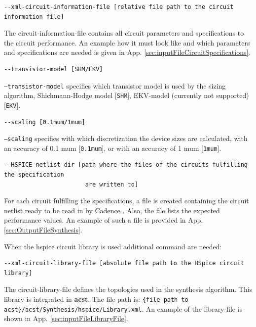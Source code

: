 \begin{lstlisting}[basicstyle=\ttfamily\scriptsize,backgroundcolor={\color{gray!30}}, escapechar=? ]
--xml-circuit-information-file [relative file path to the circuit information file] 
\end{lstlisting}
The circuit-information-file contains all circuit parameters and specifications to the circuit performance. An example how it must look like and which parameters and specifications are needed is given in App. \ref{sec:inputFileCircuitSpecifications}.

\begin{lstlisting}[basicstyle=\ttfamily\scriptsize,backgroundcolor={\color{gray!30}}, escapechar=? ]
--transistor-model [SHM/EKV] 
\end{lstlisting}
{\tt --transistor-model} specifies which transistor model is used by the sizing algorithm, Shichmann-Hodge model [{\tt SHM}], EKV-model (currently not supported) [{\tt EKV}].

\begin{lstlisting}[basicstyle=\ttfamily\scriptsize,backgroundcolor={\color{gray!30}}, escapechar=? ]
--scaling [0.1mum/1mum] 
\end{lstlisting}
{\tt --scaling} specifies with which discretization the device sizes are calculated, with an accuracy of 0.1 mum [{\tt 0.1mum}], or with an accuracy of 1 mum [{\tt 1mum}].

\begin{lstlisting}[basicstyle=\ttfamily\scriptsize,backgroundcolor={\color{gray!30}}, escapechar=? ]
--HSPICE-netlist-dir [path where the files of the circuits fulfilling the specification 
                       are written to]
\end{lstlisting}
For each circuit fulfilling the specifications, a file is created containing the circuit netlist ready to be read in by Cadence \cite{Cadence}. Also, the file lists the expected performance values. An example of such a file is provided in App. \ref{sec:OutputFileSynthesis}.

When the hspice circuit library is used additional command are needed:
\begin{lstlisting}[basicstyle=\ttfamily\scriptsize,backgroundcolor={\color{gray!30}}, escapechar=? ]
--xml-circuit-library-file [absolute file path to the HSpice circuit library]
\end{lstlisting}
The circuit-library-file defines the topologies used in the synthesis algorithm. This library is integrated in {\bf acst}. The file path is: {\tt \{file path to acst\}/acst/Synthesis/hspice/Library.xml}. An example of the library-file is shown in App. \ref{sec:inputFileLibraryFile}.
\\

